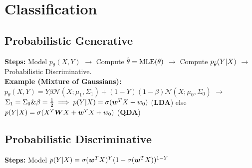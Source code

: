 \section*{Classification}


\subsection*{\color{red}Probabilistic Generative}
\textbf{Steps:} Model $p_\theta(X,Y)$ $\rightarrow$ Compute $\hat{\kern0pt \theta} = \mathrm{MLE}(\theta)$ $\rightarrow$ Compute $p_{\hat{\kern0pt \theta}}(Y|X)$ $\rightarrow$ Probabilistic Discriminative.\\
\textbf{Example (Mixture of Gaussians):} $p_\theta(X,Y)=Y\beta\mathcal{N}(X;\mu_1,\Sigma_1)+(1-Y)(1-\beta)\mathcal{N}(X;\mu_0,\Sigma_0)$ $\rightarrow$ $\Sigma_1=\Sigma_0 \& \beta=\frac{1}{2} \implies p(Y|X) = \sigma({\bm{w}}^TX + w_0)$ (\textbf{LDA}) else $p(Y|X) = \sigma(X^T{\bm{W}} X + {\bm{w}}^TX + w_0)$ (\textbf{QDA})
\subsection*{\color{orange}Probabilistic Discriminative}
\textbf{Steps:} Model $p(Y|X) = \sigma({\bm{w}}^TX)^Y(1-\sigma({\bm{w}}^TX))^{1-Y}$

